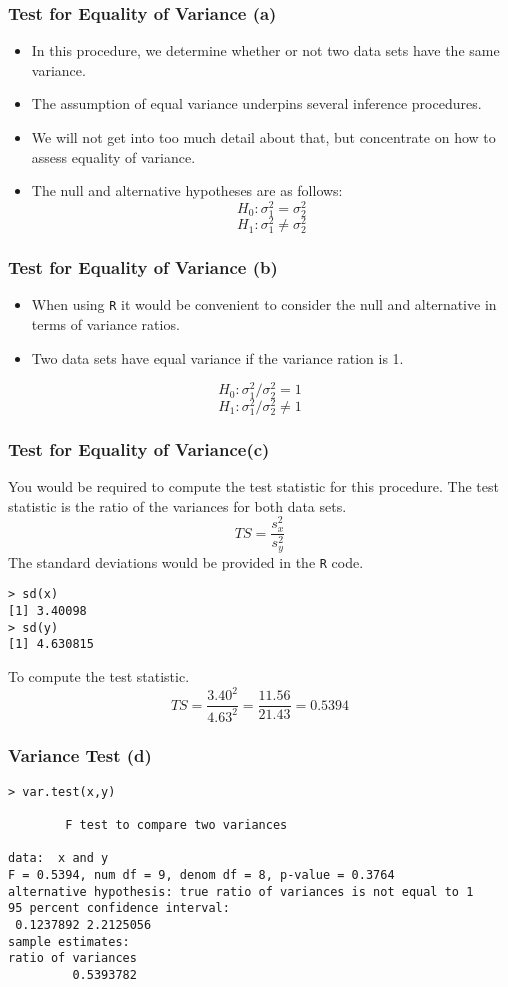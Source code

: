 \documentclass[a4]{beamer}
\begin{document}

\begin{frame}

\frametitle{Test for Equality of Variance (a)}
\begin{itemize}
\item In this procedure, we determine whether or not two data sets have the same variance.
\item The assumption of equal variance underpins several inference procedures.
\item We will not get into too much detail about that, but concentrate on how to assess equality of variance.
\item The null and alternative hypotheses are as follows:
\[ H_0: \sigma^2_1 = \sigma^2_2 \]
\[ H_1: \sigma^2_1 \neq \sigma^2_2 \]
\end{itemize}

\end{frame}
\begin{frame}
\frametitle{Test for Equality of Variance (b)}
\begin{itemize}
\item When using \texttt{R} it would be convenient to consider the null and alternative in terms of variance ratios.
\item Two data sets have equal variance if the variance ration is 1.
\end{itemize}

\[ H_0: \sigma^2_1 / \sigma^2_2 = 1 \]
\[ H_1: \sigma^2_1 / \sigma^2_2 \neq 1 \]
\end{frame}
\begin{frame}[fragile]
\frametitle{Test for Equality of Variance(c)}
You would be required to compute the test statistic for this procedure.
The test statistic is the ratio of the variances for both data sets.
\[ TS = \frac{s^2_x}{s^2_y} \]
The standard deviations would be provided in the \texttt{R} code. \begin{verbatim}
> sd(x)
[1] 3.40098
> sd(y)
[1] 4.630815
\end{verbatim}
To compute the test statistic.
\[ TS = \frac{3.40^2}{4.63^2} = \frac{11.56}{21.43} = 0.5394 \]

\end{frame}
\begin{frame}[fragile]
\frametitle{Variance Test (d)}
\begin{verbatim}
> var.test(x,y)

        F test to compare two variances

data:  x and y
F = 0.5394, num df = 9, denom df = 8, p-value = 0.3764
alternative hypothesis: true ratio of variances is not equal to 1
95 percent confidence interval:
 0.1237892 2.2125056
sample estimates:
ratio of variances
         0.5393782
\end{verbatim}

\end{frame}
\end{document}

